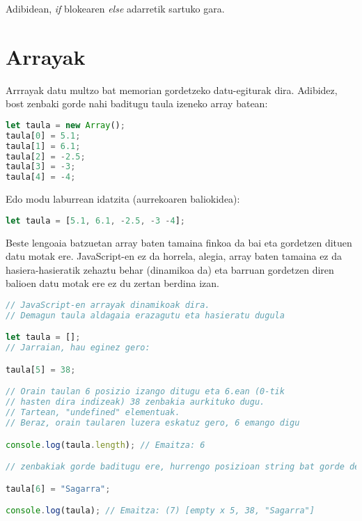 Adibidean, \textit{if} blokearen \textit{else} adarretik sartuko gara.

\section{Arrayak}
Arrrayak datu multzo bat memorian gordetzeko datu-egiturak dira. Adibidez, bost zenbaki gorde nahi baditugu taula izeneko array batean:

\begin{lstlisting}[language=JavaScript]
let taula = new Array();
taula[0] = 5.1;
taula[1] = 6.1;
taula[2] = -2.5;
taula[3] = -3;
taula[4] = -4;
\end{lstlisting}
 

Edo modu laburrean idatzita (aurrekoaren baliokidea):
 
\begin{minipage}{\linewidth}
\begin{lstlisting}[language=JavaScript]
let taula = [5.1, 6.1, -2.5, -3 -4];
\end{lstlisting}
\end{minipage}

 Beste lengoaia batzuetan array baten tamaina finkoa da bai eta gordetzen dituen datu motak ere. JavaScript-en ez da horrela, alegia, array baten tamaina ez da hasiera-hasieratik zehaztu behar (dinamikoa da) eta barruan gordetzen diren balioen datu motak ere ez du zertan berdina izan.
 
\begin{minipage}{\linewidth}
\begin{lstlisting}[language=JavaScript]
// JavaScript-en arrayak dinamikoak dira.
// Demagun taula aldagaia erazagutu eta hasieratu dugula

let taula = [];
// Jarraian, hau eginez gero:

taula[5] = 38; 

// Orain taulan 6 posizio izango ditugu eta 6.ean (0-tik
// hasten dira indizeak) 38 zenbakia aurkituko dugu. 
// Tartean, "undefined" elementuak.
// Beraz, orain taularen luzera eskatuz gero, 6 emango digu

console.log(taula.length); // Emaitza: 6

// zenbakiak gorde baditugu ere, hurrengo posizioan string bat gorde dezakegu, arazorik gabe (eta honekin, berriro, dinamikoki luzatu dugu arrayaren tamaina)

taula[6] = "Sagarra";

console.log(taula); // Emaitza: (7) [empty x 5, 38, "Sagarra"]

\end{lstlisting}
\end{minipage}
 
